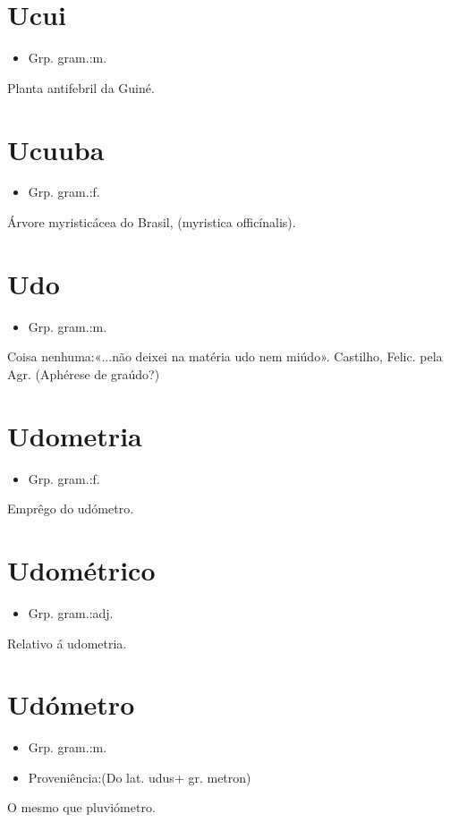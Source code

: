 \documentclass{article}
\begin{document}
\section{Ucui}
\begin{itemize}
\item {Grp. gram.:m.}
\end{itemize}
Planta antifebril da Guiné.
\section{Ucuuba}
\begin{itemize}
\item {Grp. gram.:f.}
\end{itemize}
Árvore myristicácea do Brasil, (\textunderscore myristica officínalis\textunderscore ).
\section{Udo}
\begin{itemize}
\item {Grp. gram.:m.}
\end{itemize}
Coisa nenhuma:«\textunderscore ...não deixei na matéria udo nem miúdo\textunderscore ». Castilho, \textunderscore Felic. pela Agr.\textunderscore 
(Aphérese de \textunderscore graúdo\textunderscore ?)
\section{Udometria}
\begin{itemize}
\item {Grp. gram.:f.}
\end{itemize}
Emprêgo do udómetro.
\section{Udométrico}
\begin{itemize}
\item {Grp. gram.:adj.}
\end{itemize}
Relativo á udometria.
\section{Udómetro}
\begin{itemize}
\item {Grp. gram.:m.}
\end{itemize}
\begin{itemize}
\item {Proveniência:(Do lat. \textunderscore udus\textunderscore  + gr. \textunderscore metron\textunderscore )}
\end{itemize}
O mesmo que \textunderscore pluviómetro\textunderscore .
\end{document}
